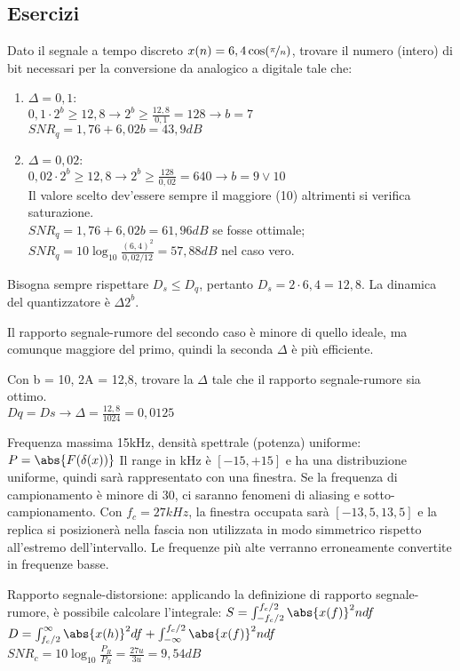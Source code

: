 \subsection{Esercizi}
Dato il segnale a tempo discreto $x(n) = 6,4 \cos (\nicefrac{\pi}{n})$, trovare il numero (intero) di bit necessari per la conversione da analogico a digitale tale che:
\begin{enumerate}
	\item $\Delta = 0,1$: \\
	$0,1 \cdot 2^b \geq 12,8 \rightarrow 2^b \geq \frac{12,8}{0,1} = 128 \rightarrow b = 7$ \\
	$SNR_q = 1,76 + 6,02b = 43,9 dB$
	\item $\Delta = 0,02$: \\
	$0,02 \cdot 2^b \geq 12,8 \rightarrow 2^b \geq \frac{128}{0,02} = 640 \rightarrow b = 9 \lor 10$ \\
	Il valore scelto dev'essere sempre il maggiore (10) altrimenti si verifica saturazione. \\
	$SNR_q = 1,76 + 6,02b = 61,96 dB$ se fosse ottimale;
	$SNR_q = 10\log_{10} \frac{(6,4)^2}{0,02 / 12} = 57,88 dB$ nel caso vero.
	\end{enumerate}
Bisogna sempre rispettare $D_s \leq D_q$, pertanto $D_s = 2 \cdot 6,4 = 12,8$. La dinamica del quantizzatore è $\Delta 2^b$. 

Il rapporto segnale-rumore del secondo caso è minore di quello ideale, ma comunque maggiore del primo, quindi la seconda $\Delta$ è più efficiente.

Con b = 10, 2A = 12,8, trovare la $\Delta$ tale che il rapporto segnale-rumore sia ottimo.\\
$Dq = Ds \rightarrow \Delta = \frac{12,8}{1024} = 0,0125$

Frequenza massima 15kHz, densità spettrale (potenza) uniforme: $P = \abs{F(\delta(x))}$
Il range in kHz è $[-15, +15]$ e ha una distribuzione uniforme, quindi sarà rappresentato con una finestra. 
Se la frequenza di campionamento è minore di 30, ci saranno fenomeni di aliasing e sotto-campionamento. 
Con $f_c = 27 kHz$, la finestra occupata sarà $[-13,5, 13,5]$ e la replica si posizionerà nella fascia non utilizzata in modo simmetrico rispetto all'estremo dell'intervallo. Le frequenze più alte verranno erroneamente convertite in frequenze basse.

Rapporto segnale-distorsione: applicando la definizione di rapporto segnale-rumore, è possibile calcolare l'integrale: $S = \int_{-f_c/2}^{f_c/2}\abs{x(f)}^2ndf$
$D = \int_{f_c/2}^{\infty} \abs{x(h)}^2 df +  \int_{-\infty}^{f_c/2}\abs{x(f)}^2ndf$
$SNR_c = 10\log_{10} \frac{P_R}{P_R} = \frac{27u}{3u} = 9,54 dB$

